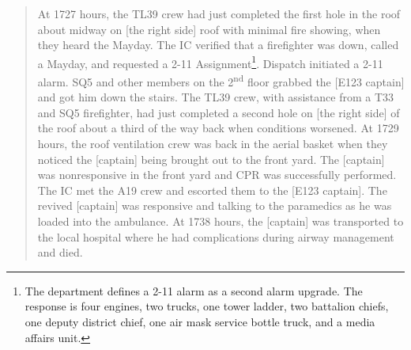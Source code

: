 \documentclass[12pt,oneside]{book}
\begin{document}
\begin{quote}
At 1727 hours, the TL39 crew had just completed the first hole in the roof about midway on [the right side] roof with minimal fire showing, when they heard the Mayday. The IC verified that a firefighter was down, called a Mayday, and requested a 2-11 Assignment\footnote{The department defines a 2-11 alarm as a second alarm upgrade. The response is four engines, two trucks, one tower ladder, two battalion chiefs, one deputy district chief, one air mask service bottle truck, and a media affairs unit.}. Dispatch initiated a 2-11 alarm. SQ5 and other members on the 2\textsuperscript{nd} floor grabbed the [E123 captain] and got him down the stairs. The TL39 crew, with assistance from a T33 and SQ5 firefighter, had just completed a second hole on [the right side] of the roof about a third of the way back when conditions worsened. At 1729 hours, the roof ventilation crew was back in the aerial basket when they noticed the [captain] being brought out to the front yard. The [captain] was nonresponsive in the front yard and CPR was successfully performed. The IC met the A19 crew and escorted them to the [E123 captain]. The revived [captain] was responsive and talking to the paramedics as he was loaded into the ambulance. At 1738 hours, the [captain] was transported to the local hospital where he had complications during airway management and died.
\end{quote}
\end{document}
